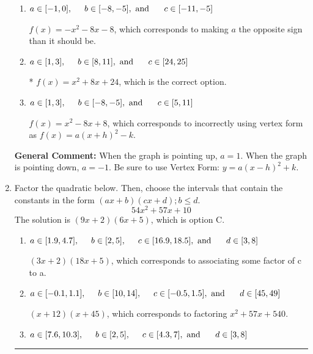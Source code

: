 \documentclass{extbook}[14pt]
\newcommand{\litem}[1]{\item #1

\rule{\textwidth}{0.4pt}}
\begin{document}
\begin{enumerate}
{\begin{enumerate}[label=\Alph*.]
$f(x)=-x^{2} +8 x -8$, which corresponds to incorrectly using vertex form as $f(x) = a(x+h)^2+k$ AND making $a$ the opposite sign than it should be.
\item \( a \in [-1, 0], \hspace*{5mm} b \in [-8, -5], \text{ and } \hspace*{5mm} c \in [-11, -5] \)

$f(x)=-x^{2} -8 x -8$, which corresponds to making $a$ the opposite sign than it should be.
\item \( a \in [1, 3], \hspace*{5mm} b \in [8, 11], \text{ and } \hspace*{5mm} c \in [24, 25] \)

* $f(x)=x^{2} +8 x + 24$, which is the correct option.
\item \( a \in [1, 3], \hspace*{5mm} b \in [-8, -5], \text{ and } \hspace*{5mm} c \in [5, 11] \)

$f(x)=x^{2} -8 x + 8$, which corresponds to incorrectly using vertex form as $f(x) = a(x+h)^2 - k$.
\end{enumerate}

\textbf{General Comment:} When the graph is pointing up, $a=1$. When the graph is pointing down, $a=-1$. Be sure to use Vertex Form: $y = a(x-h)^2+k$.
}
\litem{
Factor the quadratic below. Then, choose the intervals that contain the constants in the form $(ax+b)(cx+d); b \leq d.$
\[ 54x^{2} +57 x + 10 \]The solution is \( (9x + 2)(6x + 5) \), which is option C.\begin{enumerate}[label=\Alph*.]
\item \( a \in [1.9, 4.7], \hspace*{5mm} b \in [2, 5], \hspace*{5mm} c \in [16.9, 18.5], \text{ and } \hspace*{5mm} d \in [3, 8] \)

 $(3x + 2)(18x + 5)$, which corresponds to associating some factor of c to a.
\item \( a \in [-0.1, 1.1], \hspace*{5mm} b \in [10, 14], \hspace*{5mm} c \in [-0.5, 1.5], \text{ and } \hspace*{5mm} d \in [45, 49] \)

 $(x + 12)(x + 45)$, which corresponds to factoring $x^{2} +57 x + 540$.
\item \( a \in [7.6, 10.3], \hspace*{5mm} b \in [2, 5], \hspace*{5mm} c \in [4.3, 7], \text{ and } \hspace*{5mm} d \in [3, 8] \)


\end{enumerate}}
\end{enumerate}
\end{document}
